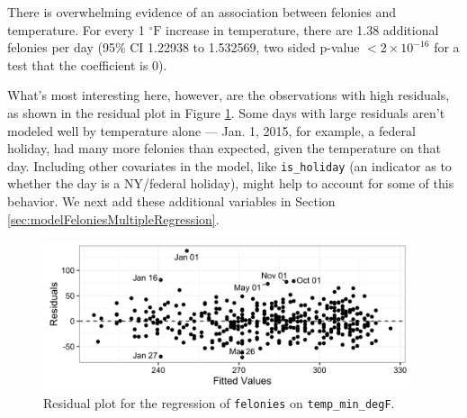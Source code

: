 \documentclass[11pt,notitlepage]{article}
\newcommand{\degf}{^\circ\text{F}}
\begin{document}

There is overwhelming evidence of an association between felonies and temperature. For every 1 $\degf$ increase in temperature, there are 1.38 additional felonies per day (95\% CI 1.22938 to 1.532569, two sided p-value $<2\times10^{-16}$ for a test that the coefficient is 0).

What's most interesting here, however, are the observations with high residuals, as shown in the residual plot in Figure \ref{fig:lm1Residuals}. Some days with large residuals aren't modeled well by temperature alone --- Jan. 1, 2015, for example, a federal holiday, had many more felonies than expected, given the temperature on that day. Including other covariates in the model, like \texttt{is_holiday} (an indicator as to whether the day is a NY/federal holiday), might help to account for some of this behavior. We next add these additional variables in Section \ref{sec:modelFeloniesMultipleRegression}.

\begin{figure}[!h]
	\centering
	\captionsetup{width=0.8\textwidth}
	\includegraphics[width=4.25in]{figures/lm1Residuals.png}
	\caption{Residual plot for the regression of \texttt{felonies} on \texttt{temp_min_degF}.}
	\label{fig:lm1Residuals}
\end{figure}

\end{document}
